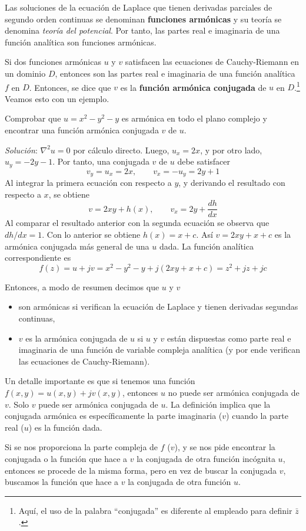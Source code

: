 Las soluciones de la ecuación de Laplace que tienen derivadas parciales de segundo orden continuas se denominan \textbf{funciones armónicas} y su teoría se denomina \textit{teoría del potencial}. Por tanto, las partes real e imaginaria de una función analítica son funciones armónicas.

Si dos funciones armónicas $u$ y $v$ satisfacen las ecuaciones de Cauchy-Riemann en un dominio $D$, entonces son las partes real e imaginaria de una función analítica $f$ en $D$. Entonces, se dice que $v$ es la \textbf{función armónica conjugada} de $u$ en $D$.\footnote{Aquí, el uso de la palabra ``conjugada'' es diferente al empleado para definir $\bar{z}$.} Veamos esto con un ejemplo.

\begin{example}
  Comprobar que $u=x^2-y^2 -y$ es armónica en todo el plano complejo y encontrar una función armónica conjugada $v$ de $u$.

  \textit{Solución}: $\nabla^2 u =0$ por cálculo directo. Luego, $u_x=2x$, y por otro lado, $u_y=-2y-1$. Por tanto, una conjugada $v$ de $u$ debe satisfacer
  \begin{equation*}
    v_y = u_x = 2x,\qquad v_x=-u_y = 2y+1
  \end{equation*}
  Al integrar la primera ecuación con respecto a $y$, y derivando el resultado con respecto a $x$, se obtiene
  \begin{equation*}
    v=2xy + h(x), \qquad v_x = 2y + \frac{dh}{dx}
  \end{equation*}
  Al comparar el resultado anterior con la segunda ecuación se observa que $dh/dx=1$. Con lo anterior se obtiene $h(x)=x+c$. Así $v=2xy+x+c$ es la armónica conjugada más general de una $u$ dada. La función analítica correspondiente es
  \[
    f(z)=u+jv=x^2-y^2-y+j(2xy+x+c)=z^2 +jz +jc
  \]
\end{example}

Entonces, a modo de resumen decimos que $u$ y $v$
\begin{itemize}
  \item son armónicas si verifican la ecuación de Laplace y tienen derivadas segundas continuas,
  \item $v$ es la armónica conjugada de $u$ si $u$ y $v$ están dispuestas como parte real e imaginaria de una función de variable compleja analítica (y por ende verifican las ecuaciones de Cauchy-Riemann).
\end{itemize}

Un detalle importante es que si tenemos una función $f(x,y)=u(x,y)+jv(x,y)$, entonces $u$ no puede ser armónica conjugada de $v$. Solo $v$ puede ser armónica conjugada de $u$. La definición implica que la conjugada armónica es específicamente la parte imaginaria ($v$) cuando la parte real ($u$) es la función dada. 

Si se nos proporciona la parte compleja de $f$ ($v$), y se nos pide encontrar la conjugada o la función que hace a $v$ la conjugada de otra función incógnita $u$, entonces se procede de la misma forma, pero en vez de buscar la conjugada $v$, buscamos la función que hace a $v$ la conjugada de otra función $u$.
